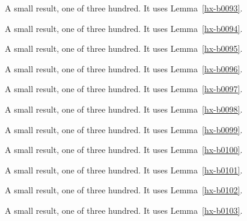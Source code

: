 \begin{lemma}[Bulk 94]\label{hx-b0094}
A small result, one of three hundred. It uses Lemma~\ref{hx-b0093}.
\end{lemma}

\begin{lemma}[Bulk 95]\label{hx-b0095}
A small result, one of three hundred. It uses Lemma~\ref{hx-b0094}.
\end{lemma}

\begin{lemma}[Bulk 96]\label{hx-b0096}
A small result, one of three hundred. It uses Lemma~\ref{hx-b0095}.
\end{lemma}

\begin{lemma}[Bulk 97]\label{hx-b0097}
A small result, one of three hundred. It uses Lemma~\ref{hx-b0096}.
\end{lemma}

\begin{lemma}[Bulk 98]\label{hx-b0098}
A small result, one of three hundred. It uses Lemma~\ref{hx-b0097}.
\end{lemma}

\begin{lemma}[Bulk 99]\label{hx-b0099}
A small result, one of three hundred. It uses Lemma~\ref{hx-b0098}.
\end{lemma}

\begin{lemma}[Bulk 100]\label{hx-b0100}
A small result, one of three hundred. It uses Lemma~\ref{hx-b0099}.
\end{lemma}

\begin{lemma}[Bulk 101]\label{hx-b0101}
A small result, one of three hundred. It uses Lemma~\ref{hx-b0100}.
\end{lemma}

\begin{lemma}[Bulk 102]\label{hx-b0102}
A small result, one of three hundred. It uses Lemma~\ref{hx-b0101}.
\end{lemma}

\begin{lemma}[Bulk 103]\label{hx-b0103}
A small result, one of three hundred. It uses Lemma~\ref{hx-b0102}.
\end{lemma}

\begin{lemma}[Bulk 104]\label{hx-b0104}
A small result, one of three hundred. It uses Lemma~\ref{hx-b0103}.
\end{lemma}

